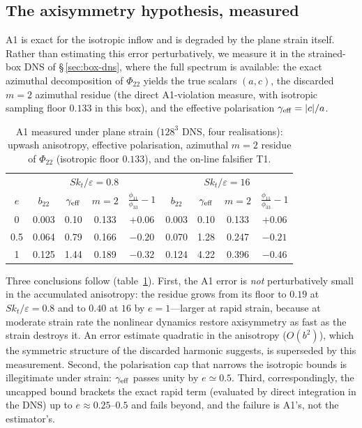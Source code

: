 \documentclass[lineno]{JFM-FLM_Au}
\begin{document}
\subsection{The axisymmetry hypothesis, measured}\label{sec:a1meas}

A1 is exact for the isotropic inflow and is degraded by the plane strain
itself. Rather than estimating this error perturbatively, we measure it in
the strained-box DNS of \S\,\ref{sec:box-dns}, where the full spectrum is
available: the exact azimuthal decomposition of $\Phi_{22}$ yields the true
scalars $(a,c)$, the discarded $m=2$ azimuthal residue (the direct
A1-violation measure, with isotropic sampling floor $0.133$ in this box),
and the effective polarisation $\gamma_{\rm eff}=|c|/a$.

\begin{table}
  \centering\small
  \begin{tabular}{c|cccc|cccc}
  & \multicolumn{4}{c|}{$Sk_t/\varepsilon=0.8$} & \multicolumn{4}{c}{$Sk_t/\varepsilon=16$}\\
  $e$ & $b_{22}$ & $\gamma_{\rm eff}$ & $m{=}2$ & $\tfrac{\phi_{11}}{\phi_{33}}{-}1$
      & $b_{22}$ & $\gamma_{\rm eff}$ & $m{=}2$ & $\tfrac{\phi_{11}}{\phi_{33}}{-}1$\\[1pt]
  0    & 0.003 & 0.10 & 0.133 & $+0.06$ & 0.003 & 0.10 & 0.133 & $+0.06$\\
  0.5  & 0.064 & 0.79 & 0.166 & $-0.20$ & 0.070 & 1.28 & 0.247 & $-0.21$\\
  1    & 0.125 & 1.44 & 0.189 & $-0.32$ & 0.124 & 4.22 & 0.396 & $-0.46$\\
  \end{tabular}
  \caption{A1 measured under plane strain ($128^3$ DNS, four realisations):
  upwash anisotropy, effective polarisation, azimuthal $m=2$ residue of
  $\Phi_{22}$ (isotropic floor $0.133$), and the on-line falsifier T1.}
  \label{tab:a1meas}
\end{table}

Three conclusions follow (table~\ref{tab:a1meas}). First, the A1 error is
\emph{not} perturbatively small in the accumulated anisotropy: the residue
grows from its floor to $0.19$ at $Sk_t/\varepsilon=0.8$ and to $0.40$ at
$16$ by $e=1$---larger at rapid strain, because at moderate strain rate the
nonlinear dynamics restore axisymmetry as fast as the strain destroys it.
An error estimate quadratic in the anisotropy ($O(b^2)$), which the symmetric structure of the discarded
harmonic suggests, is superseded by this measurement.
Second, the
polarisation cap that narrows the isotropic bounds is illegitimate under
strain: $\gamma_{\rm eff}$ passes unity by $e\simeq0.5$. Third,
correspondingly, the uncapped bound brackets the exact rapid term
(evaluated by direct integration in the DNS) up to $e\approx0.25$--$0.5$
and fails beyond, and the failure is A1's, not the estimator's.
\end{document}

